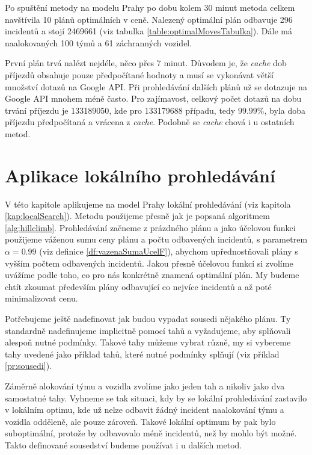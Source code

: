 Po spuštění metody na modelu Prahy po dobu kolem 30 minut metoda celkem navštívila 10 plánů optimálních v ceně.
Nalezený optimální plán odbavuje 296 incidentů a stojí 2469661 (viz tabulka \ref{table:optimalMovesTabulka}).
Dále má naalokovaných 100 týmů a 61 záchranných vozidel.

První plán trvá nalézt nejdéle, něco přes 7 minut. Důvodem je, že \textit{cache} dob příjezdů obsahuje pouze předpočítané hodnoty a musí se vykonávat větší množství
dotazů na Google API.
Při prohledávání dalších plánů už se dotazuje na Google API mnohem méně často.
Pro zajímavost, celkový počet dotazů na dobu trvání příjezdu je 133189050, kde pro 133179688 případu, tedy $99.99\%$, byla doba příjezdu předpočítaná a vrácena z \textit{cache}.
Podobně se \textit{cache} chová i u ostatních metod.

\section{Aplikace lokálního prohledávání}

V této kapitole aplikujeme na model Prahy lokální prohledávání (viz kapitola \ref{kap:localSearch}).
Metodu použijeme přesně jak je popsaná algoritmem \ref{alg:hillclimb}.
Prohledávání začneme z prázdného plánu a jako účelovou funkci použijeme váženou sumu ceny plánu a počtu odbavených incidentů, s parametrem $\alpha = 0.99$ (viz definice \ref{df:vazenaSumaUcelF}),
abychom upřednostňovali plány s vyšším počtem odbavených incidentů.
Jakou přesně účelovou funkci si zvolíme uvážíme podle toho, co pro nás konkrétně znamená optimální plán.
My budeme chtít zkoumat především plány odbavující co nejvíce incidentů a až poté minimalizovat cenu.

Potřebujeme ještě nadefinovat jak budou vypadat sousedi nějakého plánu.
Ty standardně nadefinujeme implicitně pomocí tahů a vyžadujeme, aby splňovali alespoň nutné podmínky.
Takové tahy můžeme vybrat různě, my si vybereme tahy uvedené jako příklad tahů, které nutné podmínky splňují (viz příklad \ref{pr:sousedi}).

Záměrně alokování týmu a vozidla zvolíme jako jeden tah a nikoliv jako dva samostatné tahy. Vyhneme se tak situaci, kdy by se lokální prohledávání zastavilo v lokálním optimu, 
kde už nelze odbavit žádný incident naalokování týmu a vozidla odděleně, ale pouze zároveň. Takové lokální optimum by pak bylo suboptimální, protože by odbavovalo méně incidentů, než by mohlo být možné.
Takto definované sousedství budeme používat i u dalších metod.

